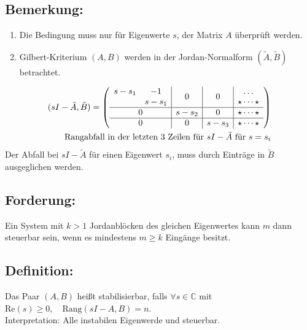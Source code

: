 \documentclass[ngerman]{tudscrreprt}
\begin{document}
\subsection*{Bemerkung:} 
\begin{enumerate}
\item Die Bedingung muss nur für Eigenwerte $s$, der Matrix $A$ überprüft werden.
\item Gilbert-Kriterium $(A,B)$ werden in der Jordan-Normalform $(\tilde A, \tilde B)$ betrachtet.
\end{enumerate}
\begin{align*}
(sI - \tilde A, \tilde B) = \left(
\begin{array}{ c | c | c | c }
\begin{matrix}
s-s_1 & -1\\ & s-s_1
\end{matrix} & 0 & 0&\begin{matrix} \dots\\ \star \dots \star \end{matrix} \\ \hline
0 & s - s_2 & 0 & \star \dots \star \\ \hline
0 & 0 & s- s_3 & \star \dots \star
\end{array}\right)\\
\text{Rangabfall in der letzten 3 Zeilen für $sI - \tilde A$ für $s = s_i$}
\end{align*}
Der Abfall bei $sI - \tilde A$ für einen Eigenwert $s_i$, muss durch Einträge in $\tilde B$ ausgeglichen werden. 
\subsection*{Forderung:} Ein System mit $k > 1$ Jordanblöcken des gleichen Eigenwertes kann $m$ dann steuerbar sein, wenn es mindestens $m \ge k$ Eingänge besitzt.
\subsection*{Definition:}Das Paar $(A, B)$ heißt stabilisierbar, falls $\forall s \in \mathbb{C} $ mit $\text{Re} (s) \ge 0, \quad \text{Rang} (sI - A, B) = n.$\\ 
Interpretation: Alle instabilen Eigenwerde und steuerbar. 
\end{document}
